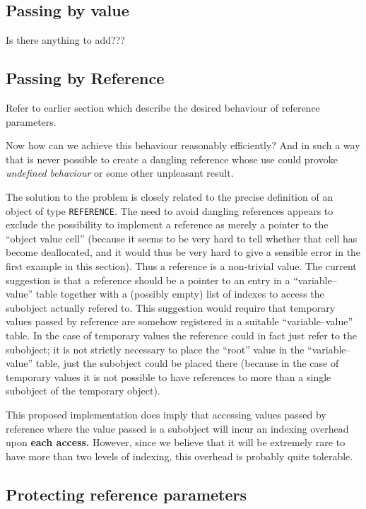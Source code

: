 \documentclass{book}[12,a4paper]
\begin{document}
\subsection{Passing by value}

Is there anything to add???

\subsection{Passing by Reference}
Refer to earlier section which describe the desired behaviour of reference parameters.

Now how can we achieve this behaviour reasonably efficiently?  And in such a
way that is never possible to create a dangling reference whose use could
provoke {\it undefined behaviour\/} or some other unpleasant result.

The solution to the problem is closely related to the precise definition
of an object of type \texttt{REFERENCE}.  The need to avoid dangling references
appears to exclude the possibility to implement a reference as merely a
pointer to the ``object value cell'' (because it seems to be very hard to
tell whether that cell has become deallocated, and it would thus be very hard
to give a sensible error in the first example in this section).  Thus a
reference is a non-trivial value.  The current suggestion is that a
reference should be a pointer to an entry in a ``variable--value''
table together with a (possibly empty) list of indexes to access
the subobject actually refered to.  This suggestion would require that
temporary values passed by reference are somehow registered in a suitable
``variable--value'' table.  In the case of temporary values the reference
could in fact just refer to the subobject; it is not strictly necessary to
place the ``root'' value in the ``variable--value'' table, just the
subobject could be placed there (because in the case of temporary values it
is not possible to have references to more than a single subobject of the
temporary object).

This proposed implementation does imply that accessing values passed by
reference where the value passed is a subobject will incur an indexing
overhead upon {\bf each access.}  However, since we believe that it will be
extremely rare to have more than two levels of indexing, this overhead is
probably quite tolerable.

\subsection{Protecting reference parameters}
\label{protecting-reference-parameters}
\end{document}

